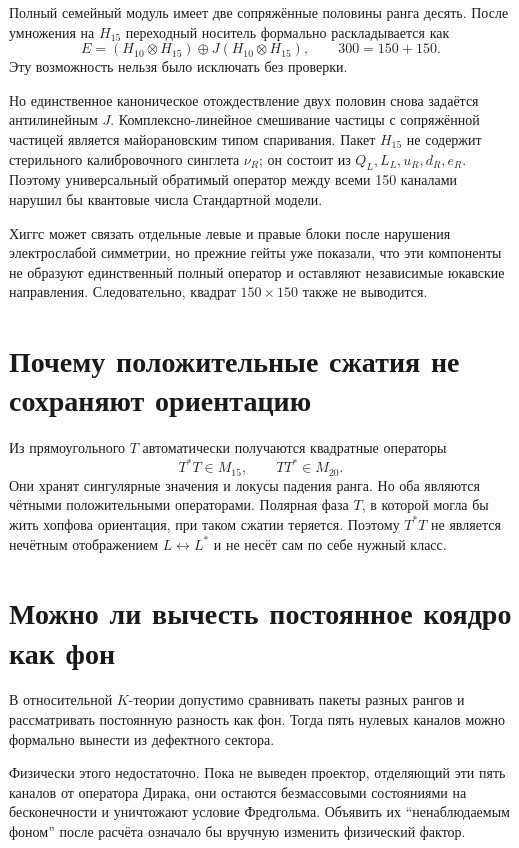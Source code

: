 Полный семейный модуль имеет две сопряжённые половины ранга десять. После
умножения на $H_{15}$ переходный носитель формально раскладывается как
\begin{equation}
 E=(H_{10}\otimes H_{15})
 \oplus J(H_{10}\otimes H_{15}),
 \qquad 300=150+150.
 \label{eq:v5-odd-core-150-pair}
\end{equation}
Эту возможность нельзя было исключать без проверки.

Но единственное каноническое отождествление двух половин снова задаётся
антилинейным $J$. Комплексно-линейное смешивание частицы с сопряжённой
частицей является майорановским типом спаривания. Пакет $H_{15}$ не
содержит стерильного калибровочного синглета $\nu_R$; он состоит из
$Q_L,L_L,u_R,d_R,e_R$. Поэтому универсальный обратимый оператор между
всеми 150 каналами нарушил бы квантовые числа Стандартной модели.

Хиггс может связать отдельные левые и правые блоки после нарушения
электрослабой симметрии, но прежние гейты уже показали, что эти компоненты
не образуют единственный полный оператор и оставляют независимые
юкавские направления. Следовательно, квадрат $150\times150$ также не
выводится.

\section{Почему положительные сжатия не сохраняют ориентацию}

Из прямоугольного $T$ автоматически получаются квадратные операторы
\begin{equation}
 T^*T\in M_{15},
 \qquad
 TT^*\in M_{20}.
\end{equation}
Они хранят сингулярные значения и локусы падения ранга. Но оба являются
чётными положительными операторами. Полярная фаза $T$, в которой могла бы
жить хопфова ориентация, при таком сжатии теряется. Поэтому $T^*T$ не
является нечётным отображением $L\leftrightarrow L^*$ и не несёт сам по
себе нужный класс.

\section{Можно ли вычесть постоянное коядро как фон}

В относительной $K$-теории допустимо сравнивать пакеты разных рангов и
рассматривать постоянную разность как фон. Тогда пять нулевых каналов
можно формально вынести из дефектного сектора.

Физически этого недостаточно. Пока не выведен проектор, отделяющий эти
пять каналов от оператора Дирака, они остаются безмассовыми состояниями на
бесконечности и уничтожают условие Фредгольма. Объявить их
``ненаблюдаемым фоном'' после расчёта означало бы вручную изменить
физический фактор.

